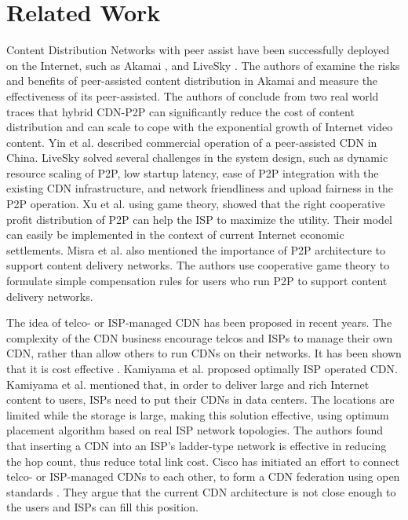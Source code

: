 \documentclass[10pt,final,journal,a4paper]{IEEEtran}
\begin{document}
\section{Related Work}\label{relatedwork}
Content Distribution Networks with peer assist have been successfully deployed on the Internet, such as Akamai \cite{Zhao:2013:PCD:2504730.2504752}, \cite{Huang:2008:UHC:1496046.1496064} and LiveSky \cite{Yin:2010:LEC:1823746.1823750}.  
The authors of \cite{Zhao:2013:PCD:2504730.2504752} examine the risks and benefits of peer-assisted content distribution in Akamai and measure the effectiveness of its peer-assisted. 
The authors of \cite{Huang:2008:UHC:1496046.1496064} conclude from two real world traces that hybrid CDN-P2P can significantly reduce the cost of content distribution and can scale to cope with the exponential growth of Internet video content.  
Yin et al. \cite{Yin:2010:LEC:1823746.1823750} described commercial operation of a peer-assisted CDN in China.  
LiveSky solved several challenges in the system design, such as dynamic resource scaling of P2P, low startup latency, ease of P2P integration with the existing CDN infrastructure, and network friendliness and upload fairness in the P2P operation.  
Xu et al.\cite{DBLP:journals/corr/abs-1212-4915} using game theory, showed that the right cooperative profit distribution of P2P can help the ISP to maximize the utility.  
Their model can easily be implemented in the context of current Internet economic settlements.  
Misra et al.\cite{Misra:2010:IPS:1811099.1811064} also mentioned the importance of P2P architecture to support content delivery networks.
The authors use cooperative game theory to formulate simple compensation rules for users who run P2P to support content delivery networks.

The idea of telco- or ISP-managed CDN has been proposed in recent years.  
The complexity of the CDN business encourage telcos and ISPs to manage their own CDN, rather than allow others to run CDNs on their networks.  
It has been shown that it is cost effective \cite{federation}\cite{norton2011internet}. 
Kamiyama et al. \cite{NoriakiKAMIYAMA2013} proposed optimally ISP operated CDN.
Kamiyama et al. mentioned that, in order to deliver large and rich Internet content to users, ISPs need to put their CDNs in data centers.  
The locations are limited while the storage is large, making this solution effective, using optimum placement algorithm based on real ISP network topologies.  
The authors found that inserting a CDN into an ISP's ladder-type network is effective in reducing the hop count, thus reduce total link cost.  
Cisco has initiated an effort to connect telco- or ISP-managed CDNs to each other, to form a CDN federation \cite{federation} using open standards \cite{cdni}.  
They argue that the current CDN architecture is not close enough to the users and ISPs can fill this position.
\end{document}

